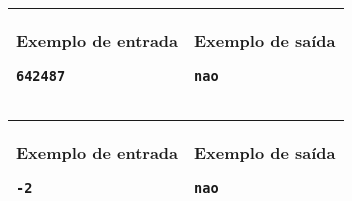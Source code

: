 \begin{table}[!h]
\centering
\begin{tabular}{|l|l|}
\hline
\begin{minipage}[t]{3in}
\textbf{Exemplo de entrada}
\begin{verbatim}
642487
\end{verbatim}
\vspace{1mm}
\end{minipage}
&
\begin{minipage}[t]{3in}
\textbf{Exemplo de saída}
\begin{verbatim}
nao
\end{verbatim}
\vspace{1mm}
\end{minipage} \\
\hline
\end{tabular}
\end{table}

\begin{table}[!h]
\centering
\begin{tabular}{|l|l|}
\hline
\begin{minipage}[t]{3in}
\textbf{Exemplo de entrada}
\begin{verbatim}
-2
\end{verbatim}
\vspace{1mm}
\end{minipage}
&
\begin{minipage}[t]{3in}
\textbf{Exemplo de saída}
\begin{verbatim}
nao
\end{verbatim}
\vspace{1mm}
\end{minipage} \\
\hline
\end{tabular}
\end{table}
